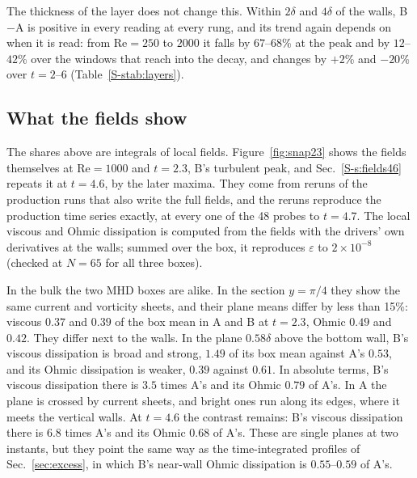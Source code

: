 \documentclass[aip,pop,reprint,amsmath,amssymb,superscriptaddress,floatfix]{revtex4-2}
\newcommand{\Rey}{\mathrm{Re}}
\newcommand{\eps}{\varepsilon}
\begin{document}
The thickness of the layer does not change this. Within $2\delta$ and $4\delta$ of
the walls, B$-$A is positive in every reading at every rung, and its trend again
depends on when it is read: from $\Rey=250$ to $2000$ it falls by $67$--$68$\% at the
peak and by $12$--$42$\% over the windows that reach into the decay, and changes by
$+2$\% and $-20$\% over $t=2$--$6$ (Table~\ref{S-stab:layers}).

\begin{table}
\caption{\label{tab:windows}B$-$A in the share within $\delta$ of the walls: at the
turbulent peak, integrated over fixed time windows, and integrated over windows
bounded by each run's own total energy. The last column is the change from $\Rey=250$
to $2000$. Grid bands are at most $0.0010$ for the time windows and $0.0027$ for the
energy windows.}
\begin{ruledtabular}

\end{ruledtabular}
\end{table}

\subsection{What the fields show}
\label{sec:fields}

The shares above are integrals of local fields. Figure~\ref{fig:snap23} shows the
fields themselves at $\Rey=1000$ and $t=2.3$, B's turbulent peak, and
Sec.~\ref{S-s:fields46} repeats it at $t=4.6$, by the later maxima. They come from
reruns of the
production runs that also write the full fields, and the reruns reproduce the
production time series exactly, at every one of the 48 probes to $t=4.7$. The local
viscous and Ohmic dissipation is computed from the fields with the drivers' own
derivatives at the walls; summed over the box, it reproduces $\eps$ to
$2\times10^{-8}$ (checked at $N=65$ for all three boxes).

In the bulk the two MHD boxes are alike. In the section $y=\pi/4$ they show the same
current and vorticity sheets, and their plane means differ by less than 15\%: viscous
$0.37$ and $0.39$ of the box mean in A and B at $t=2.3$, Ohmic $0.49$ and $0.42$. They
differ next to the walls. In the plane $0.58\delta$ above the bottom wall, B's viscous
dissipation is broad and strong, $1.49$ of its box mean against A's $0.53$, and its
Ohmic dissipation is weaker, $0.39$ against $0.61$. In absolute terms, B's viscous
dissipation there is $3.5$ times A's and its Ohmic $0.79$ of A's. In A the plane is
crossed by current sheets, and bright ones run along its edges, where it meets the
vertical walls. At $t=4.6$ the contrast remains: B's viscous dissipation there is
$6.8$ times A's and its Ohmic $0.68$ of A's. These are single planes at two
instants, but they point the same way as the time-integrated profiles of
Sec.~\ref{sec:excess}, in which B's near-wall Ohmic dissipation is $0.55$--$0.59$ of
A's.
\end{document}
